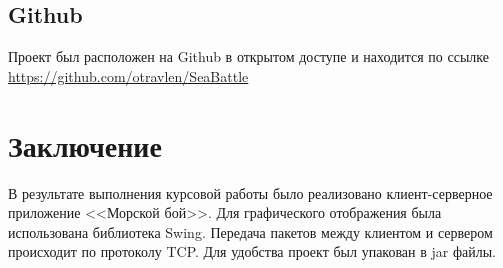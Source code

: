 \documentclass{article}
\begin{document}
			\subsection{Github}
				Проект был расположен на Github в открытом доступе и находится по ссылке \url{https://github.com/otravlen/SeaBattle}
		\section{Заключение}
			В результате выполнения курсовой работы было реализовано клиент-серверное приложение <<Морской бой>>. Для графического отображения была использована библиотека Swing. Передача пакетов между клиентом и сервером происходит по протоколу TCP. Для удобства проект был упакован в jar файлы.
\end{document}
